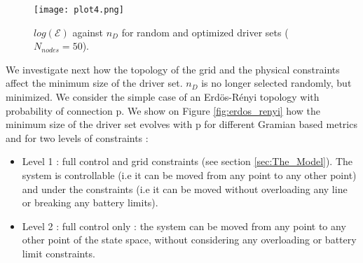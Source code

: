 \documentclass[conference]{IEEEtran}
\begin{document}


\begin{figure}
\texttt{[image: plot4.png]}%
\caption{$log(\mathcal{E})$ against $n_D$ for random and optimized driver sets ($ N_{nodes} = 50 $).}
\label{fig:densities}
\end{figure}

We investigate next how the topology of the grid and the physical constraints affect the minimum size of the driver set. $n_D$ is no longer selected randomly, but minimized. We consider the simple case of an Erdös-Rényi topology with probability of connection p. We show on Figure \ref{fig:erdos_renyi} how the minimum size of the driver set evolves with p for different Gramian based metrics and for two levels of constraints : 

\begin{itemize}
\item Level 1 : full control and grid constraints (see section \ref{sec:The_Model}). The system is controllable (i.e it can be moved from any point to any other point) and under the constraints (i.e it can be moved without overloading any line or breaking any battery limits).
\item Level 2 : full control only : the system can be moved from any point to any other point of the state space, without considering any overloading or battery limit constraints. 
\end{itemize}
\end{document}
